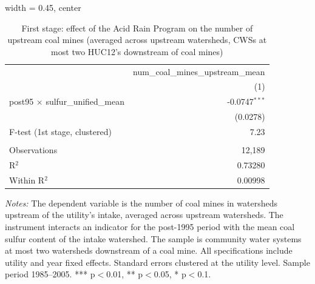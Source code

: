 
\begin{table}[htbp]
   
   \caption{\label{tab:fs_dwnstrm2step_minevio} First stage: effect of the Acid Rain Program on the number of upstream coal mines (averaged across upstream watersheds, CWSs at most two HUC12's downstream of coal mines)}
   \bigskip
   
   \centering
   
   \begin{adjustbox}{width = 0.45\textwidth, center}
      
      
      \begin{tabular}{lr}
         \toprule
         
                                                  & num\_coal\_mines\_upstream\_mean\\      
         
                                                  & (1)\\  
         
         \midrule 
         post95 $\times$ sulfur\_unified\_mean    & -0.0747$^{***}$\\   
                                                  & (0.0278)\\   
         
         F-test (1st stage, clustered)            & 7.23\\  
         
          \\
         
         Observations                             & 12,189\\  
         R$^2$                                    & 0.73280\\  
         Within R$^2$                             & 0.00998\\  
         
         \bottomrule
         
      \end{tabular}
      
      
      
   \end{adjustbox}
      {\tiny\linespread{1}\selectfont \par \raggedright 
   \textit{Notes:} The dependent variable is the number of coal mines in watersheds upstream of the utility's intake, averaged across upstream watersheds. The instrument interacts an indicator for the post-1995 period with the mean coal sulfur content of the intake watershed. The sample is community water systems at most two watersheds downstream of a coal mine. All specifications include utility and year fixed effects. Standard errors clustered at the utility level. Sample period 1985--2005. *** p$<$0.01, ** p$<$0.05, * p$<$0.1.}
   
\end{table}



